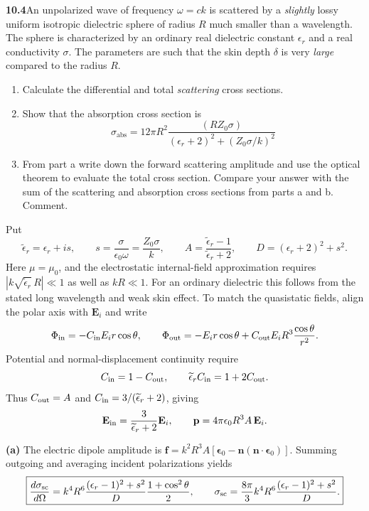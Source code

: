 \par\bigskip
\noindent\textbf{10.4}\quad An unpolarized wave of frequency $\omega=ck$ is scattered by a \emph{slightly} lossy uniform isotropic dielectric sphere of radius $R$ much smaller than a wavelength. The sphere is characterized by an ordinary real dielectric constant $\epsilon_{r}$ and a real conductivity $\sigma$. The parameters are such that the skin depth $\delta$ is very \emph{large} compared to the radius $R$.
\begin{enumerate}
\item[(a)] Calculate the differential and total \emph{scattering} cross sections.
\item[(b)] Show that the absorption cross section is
\[
\sigma_{\mathrm{abs}}=12\pi R^{2}\frac{(RZ_{0}\sigma)}{(\epsilon_{r}+2)^{2}+(Z_{0}\sigma/k)^{2}}
\]
\item[(c)] From part a write down the forward scattering amplitude and use the optical theorem to evaluate the total cross section. Compare your answer with the sum of the scattering and absorption cross sections from parts a and b. Comment.
\end{enumerate}
\solution
Put
\[
\widetilde\epsilon_r=\epsilon_r+i s,\qquad
s=\frac{\sigma}{\epsilon_0\omega}=\frac{Z_0\sigma}{k},\qquad
A=\frac{\widetilde\epsilon_r-1}{\widetilde\epsilon_r+2},\qquad
D=(\epsilon_r+2)^2+s^2 .
\]
Here $\mu=\mu_0$, and the electrostatic internal-field approximation
requires $|k\sqrt{\widetilde\epsilon_r}\,R|\ll1$ as well as $kR\ll1$.
For an ordinary dielectric this follows from the stated long wavelength
and weak skin effect. To match the quasistatic fields, align the polar
axis with $\mathbf E_i$ and write
\[
\Phi_{\rm in}=-C_{\rm in}E_i r\cos\theta,\qquad
\Phi_{\rm out}=-E_i r\cos\theta+
C_{\rm out}E_iR^3\frac{\cos\theta}{r^2}.
\]
Potential and normal-displacement continuity require
\[
C_{\rm in}=1-C_{\rm out},\qquad
\widetilde\epsilon_r C_{\rm in}=1+2C_{\rm out}.
\]
Thus $C_{\rm out}=A$ and
$C_{\rm in}=3/(\widetilde\epsilon_r+2)$, giving
\[
\mathbf E_{\rm in}=\frac{3}{\widetilde\epsilon_r+2}\mathbf E_i,\qquad
\mathbf p=4\pi\epsilon_0R^3 A\,\mathbf E_i .
\]

\textbf{(a)} The electric dipole amplitude is
$\mathbf f=k^2R^3 A[\boldsymbol\epsilon_0-
\mathbf n(\mathbf n\cdot\boldsymbol\epsilon_0)]$.
Summing outgoing and averaging incident polarizations yields
\[
\boxed{\frac{d\sigma_{\rm sc}}{d\Omega}
=k^4R^6\frac{(\epsilon_r-1)^2+s^2}{D}
\frac{1+\cos^2\theta}{2},\qquad
\sigma_{\rm sc}=\frac{8\pi}{3}k^4R^6
\frac{(\epsilon_r-1)^2+s^2}{D}.}
\]

